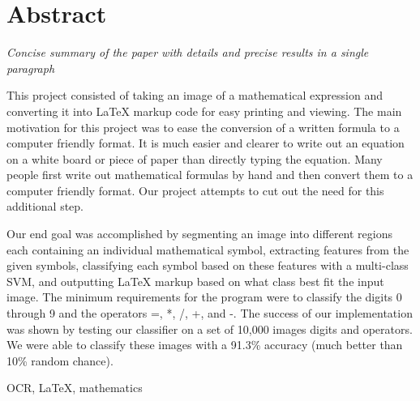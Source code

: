 \section{Abstract}
\textit{Concise summary of the paper with details and precise results in a single paragraph
}

This project consisted of taking an image of a mathematical expression and converting it into LaTeX markup code for easy printing and viewing.  The main motivation for this project was to ease the conversion of a written formula to a computer friendly format.  It is much easier and clearer to write out an equation on a white board or piece of paper than directly typing the equation. Many people first write out mathematical formulas by hand and then convert them to a computer friendly format.  Our project attempts to cut out the need for this additional step.  

Our end goal was accomplished by segmenting an image into different regions each containing an individual mathematical symbol, extracting features from the given symbols, classifying each symbol based on these features with a multi-class SVM, and outputting LaTeX markup based on what class best fit the input image.  The minimum requirements for the program were to classify the digits 0 through 9 and the operators =, *, /, +, and -.  The success of our implementation was shown by testing our classifier on a set of 10,000 images digits and operators. We were able to classify these images with a 91.3\% accuracy (much better than 10\% random chance).

\begin{keywords}
OCR, LaTeX, mathematics
\end{keywords}